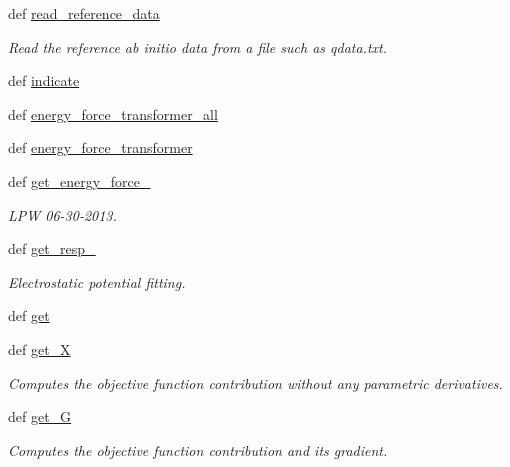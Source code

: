 \begin{DoxyCompactItemize}
\item 
def \hyperlink{classforcebalance_1_1abinitio_1_1AbInitio_aa73bedbf1e2cf19f2fa1e88815f1bd86}{read\-\_\-reference\-\_\-data}
\begin{DoxyCompactList}\small\item\em Read the reference ab initio data from a file such as qdata.\-txt. \end{DoxyCompactList}\item 
def \hyperlink{classforcebalance_1_1abinitio_1_1AbInitio_a3260db78e8c174f04a64661c4e5c181c}{indicate}
\item 
def \hyperlink{classforcebalance_1_1abinitio_1_1AbInitio_a3d28520925c6dfd179647d0abf7e1368}{energy\-\_\-force\-\_\-transformer\-\_\-all}
\item 
def \hyperlink{classforcebalance_1_1abinitio_1_1AbInitio_a9167da321a9fff748eef5ebe754cc7ca}{energy\-\_\-force\-\_\-transformer}
\item 
def \hyperlink{classforcebalance_1_1abinitio_1_1AbInitio_a313c848f46579817803c8a3ff100974e}{get\-\_\-energy\-\_\-force\-\_\-}
\begin{DoxyCompactList}\small\item\em L\-P\-W 06-\/30-\/2013. \end{DoxyCompactList}\item 
def \hyperlink{classforcebalance_1_1abinitio_1_1AbInitio_abfe50569805218075c5942fd3be8bbe7}{get\-\_\-resp\-\_\-}
\begin{DoxyCompactList}\small\item\em Electrostatic potential fitting. \end{DoxyCompactList}\item 
def \hyperlink{classforcebalance_1_1abinitio_1_1AbInitio_a2bb3ed7209707f688ec8b731392466b5}{get}
\item 
def \hyperlink{classforcebalance_1_1target_1_1Target_a606dd136f195c267c05a2455405e5949}{get\-\_\-\-X}
\begin{DoxyCompactList}\small\item\em Computes the objective function contribution without any parametric derivatives. \end{DoxyCompactList}\item 
def \hyperlink{classforcebalance_1_1target_1_1Target_afa8cc38c8bba8861c072e789717aa049}{get\-\_\-\-G}
\begin{DoxyCompactList}\small\item\em Computes the objective function contribution and its gradient. \end{DoxyCompactList}\item 

\end{DoxyCompactItemize}
